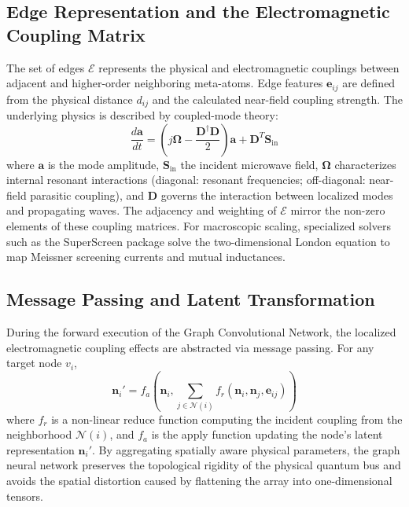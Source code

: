 \documentclass[11pt, a4paper]{article}
\begin{document}
\subsection{Edge Representation and the Electromagnetic Coupling Matrix}

The set of edges $\mathcal{E}$ represents the physical and electromagnetic couplings between adjacent and higher-order neighboring meta-atoms. Edge features $\mathbf{e}_{ij}$ are defined from the physical distance $d_{ij}$ and the calculated near-field coupling strength. The underlying physics is described by coupled-mode theory:
\begin{equation}
\frac{d\mathbf{a}}{dt} = \left( j\mathbf{\Omega} - \frac{\mathbf{D}^\dagger \mathbf{D}}{2} \right)\mathbf{a} + \mathbf{D}^T \mathbf{S}_{\mathrm{in}}
\end{equation}
where $\mathbf{a}$ is the mode amplitude, $\mathbf{S}_{\mathrm{in}}$ the incident microwave field, $\mathbf{\Omega}$ characterizes internal resonant interactions (diagonal: resonant frequencies; off-diagonal: near-field parasitic coupling), and $\mathbf{D}$ governs the interaction between localized modes and propagating waves. The adjacency and weighting of $\mathcal{E}$ mirror the non-zero elements of these coupling matrices. For macroscopic scaling, specialized solvers such as the SuperScreen package solve the two-dimensional London equation to map Meissner screening currents and mutual inductances.

\subsection{Message Passing and Latent Transformation}

During the forward execution of the Graph Convolutional Network, the localized electromagnetic coupling effects are abstracted via message passing. For any target node $v_i$,
\begin{equation}
\mathbf{n}_i' = f_a\left( \mathbf{n}_i, \sum_{j \in \mathcal{N}(i)} f_r(\mathbf{n}_i, \mathbf{n}_j, \mathbf{e}_{ij}) \right)
\end{equation}
where $f_r$ is a non-linear reduce function computing the incident coupling from the neighborhood $\mathcal{N}(i)$, and $f_a$ is the apply function updating the node's latent representation $\mathbf{n}_i'$. By aggregating spatially aware physical parameters, the graph neural network preserves the topological rigidity of the physical quantum bus and avoids the spatial distortion caused by flattening the array into one-dimensional tensors.
\end{document}
